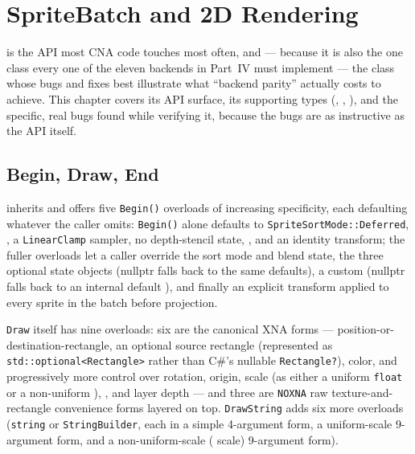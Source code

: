 \chapter{SpriteBatch and 2D Rendering}
\label{ch:spritebatch}

 is the API most CNA code touches most often, and --- because it is
also the one class every one of the eleven backends in Part~IV must implement --- the class
whose bugs and fixes best illustrate what ``backend parity'' actually costs to achieve. This
chapter covers its API surface, its supporting types (,
, ), and the specific, real bugs found while
verifying it, because the bugs are as instructive as the API itself.

\section{Begin, Draw, End}

 inherits  and offers five \texttt{Begin()}
overloads of increasing specificity, each defaulting whatever the caller omits:
\texttt{Begin()} alone defaults to \texttt{SpriteSortMode::Deferred},
, a \texttt{LinearClamp} sampler, no depth-stencil state,
, and an identity transform; the fuller
overloads let a caller override the sort mode and blend state, the three optional state
objects (nullptr falls back to the same defaults), a custom  (nullptr falls
back to an internal default ), and finally an explicit transform
 applied to every sprite in the batch before projection.

\texttt{Draw} itself has nine overloads: six are the canonical XNA forms ---
position-or-destination-rectangle, an optional source rectangle (represented as
\texttt{std::optional<Rectangle>} rather than C\#'s nullable \texttt{Rectangle?}), color, and
progressively more control over rotation, origin, scale (as either a uniform \texttt{float} or
a non-uniform ), , and layer depth --- and three are
\texttt{NOXNA} raw texture-and-rectangle convenience forms layered on top.
\texttt{DrawString} adds six more overloads (\texttt{string} or \texttt{StringBuilder}, each in
a simple 4-argument form, a uniform-scale 9-argument form, and a non-uniform-scale
( scale) 9-argument form).

